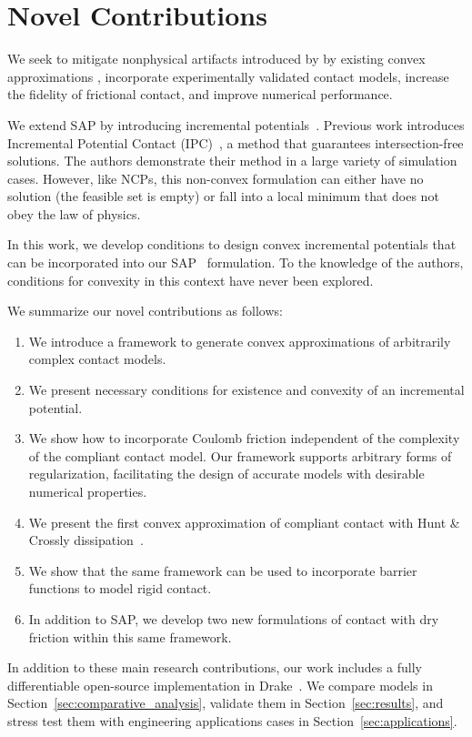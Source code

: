 \section{Novel Contributions}

We seek to mitigate nonphysical artifacts introduced by by existing convex
approximations \cite{bib:anitescu2006, bib:todorov2011,
bib:castro2022unconstrained}, incorporate experimentally validated contact
models, increase the fidelity of frictional contact, and improve numerical
performance.

We extend SAP \cite{bib:castro2022unconstrained} by introducing incremental
potentials~\cite{bib:pandolfi2002}. Previous work introduces Incremental
Potential Contact (IPC)~\cite{bib:li2020ipc}, a method that guarantees
intersection-free solutions. The authors demonstrate their method in a large
variety of simulation cases. However, like NCPs, this non-convex formulation can
either have no solution (the feasible set is empty) or fall into a local minimum
that does not obey the law of physics.

In this work, we develop conditions to design convex incremental potentials
that can be incorporated into our SAP~\cite{bib:castro2020} formulation. To the
knowledge of the authors, conditions for convexity in this context have never
been explored.

We summarize our novel contributions as follows:
\begin{enumerate}
    \item We introduce a framework to generate convex approximations of
    arbitrarily complex contact models.
    \item We present necessary conditions for existence and convexity of an
    incremental potential.
    \item We show how to incorporate Coulomb friction independent of the
    complexity of the compliant contact model. Our framework supports arbitrary
    forms of regularization, facilitating the design of accurate models with
    desirable numerical properties.
    \item We present the first convex approximation of compliant
    contact with Hunt \& Crossly dissipation~\cite{bib:hunt_crossley}.
    \item We show that the same framework can be used to incorporate barrier
    functions to model rigid contact.
    \item In addition to SAP, we develop two new formulations of contact with
    dry friction within this same framework.
\end{enumerate}

In addition to these main research contributions, our work includes a fully
differentiable open-source implementation in Drake~\cite{bib:drake}. We compare
models in Section~\ref{sec:comparative_analysis}, validate them in
Section~\ref{sec:results}, and stress test them with engineering applications
cases in Section~\ref{sec:applications}.
